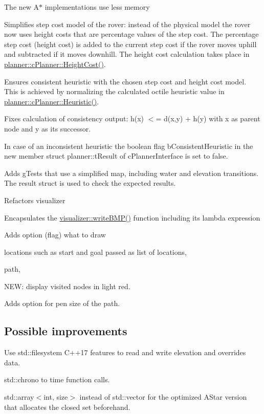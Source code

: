 \begin{DoxyItemize}
\item The new A$\ast$ implementations use less memory
\item Simplifies step cost model of the rover\+: instead of the physical model the rover now uses height costs that are percentage values of the step cost. The percentage step cost (height cost) is added to the current step cost if the rover moves uphill and subtracted if it moves downhill. The height cost calculation takes place in \mbox{\hyperlink{classplanner_1_1c_planner_a9d57a0697bb0e4666f4fd45f77c4a1aa}{planner\+::c\+Planner\+::\+Height\+Cost()}}.
\item Ensures consistent heuristic with the chosen step cost and height cost model. This is achieved by normalizing the calculated octile heuristic value in \mbox{\hyperlink{classplanner_1_1c_planner_a77cefeae3d7a58a96c74b66f6be22611}{planner\+::c\+Planner\+::\+Heuristic()}}.
\item Fixes calculation of consistency output\+: h(x) $<$= d(x,y) + h(y) with x as parent node and y as its successor.
\item In case of an inconsistent heuristic the boolean flag b\+Consistent\+Heuristic in the new member struct planner\+::t\+Result of c\+Planner\+Interface is set to false.
\item Adds g\+Tests that use a simplified map, including water and elevation transitions. The result struct is used to check the expected results.
\item Refactors visualizer
\begin{DoxyItemize}
\item Encapsulates the \mbox{\hyperlink{namespacevisualizer_ab4e649cd7413a51ac1ae4b31a2994c3a}{visualizer\+::write\+B\+M\+P()}} function including its lambda expression
\item Adds option (flag) what to draw
\begin{DoxyItemize}
\item locations such as start and goal passed as list of locations,
\item path,
\item N\+EW\+: display visited nodes in light red.
\end{DoxyItemize}
\item Adds option for pen size of the path.
\end{DoxyItemize}
\end{DoxyItemize}

\subsection*{Possible improvements}


\begin{DoxyItemize}
\item Use std\+::filesystem C++17 features to read and write elevation and overrides data.
\item std\+::chrono to time function calls.
\item std\+::array$<$int, size$>$ instead of std\+::vector for the optimized A\+Star version that allocates the closed set beforehand. 
\end{DoxyItemize}
